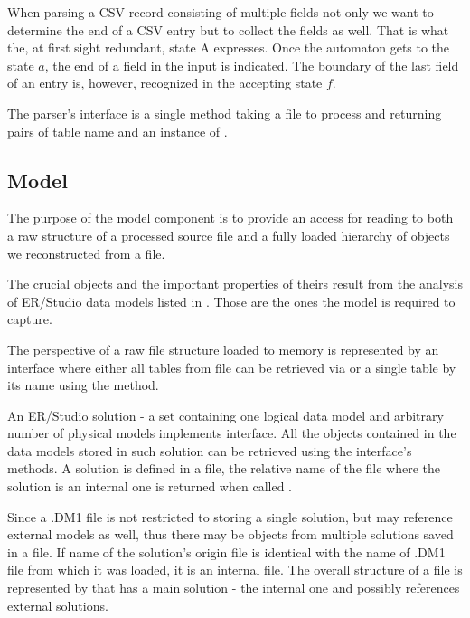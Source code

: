 When parsing a CSV record consisting of multiple fields not only we want to determine the end of a CSV entry but to collect the fields as well. That is what the, at first sight redundant, state A expresses. Once the automaton gets to the state $a$, the end of a field in the input is indicated. The boundary of the last field of an entry is, however, recognized in the accepting state $f$.

The parser's interface is a single method  taking a file to process and returning pairs of table name and an instance of .

\subsection{Model}

The purpose of the model component is to provide an access for reading to both a raw structure of a processed source file and a fully loaded hierarchy of objects we reconstructed from a file.

The crucial objects and the important properties of theirs result from the analysis of ER/Studio data models listed in . Those are the ones the model is required to capture.

The perspective of a raw file structure loaded to memory is represented by an interface  where either all tables from file can be retrieved via  or a single table by its name using the  method.

An ER/Studio solution - a set containing one logical data model and arbitrary number of physical models implements  interface. All the objects contained in the data models stored in such solution can be retrieved using the interface's methods. A solution is defined in a file, the relative name of the file where the solution is an internal one is returned when called .

Since a .DM1 file is not restricted to storing a single solution, but may reference external models as well, thus there may be objects from multiple solutions saved in a file. If name of the solution's origin file is identical with the name of .DM1 file from which it was loaded, it is an internal file. The overall structure of a file is represented by  that has a main solution - the internal one and possibly references external solutions.

